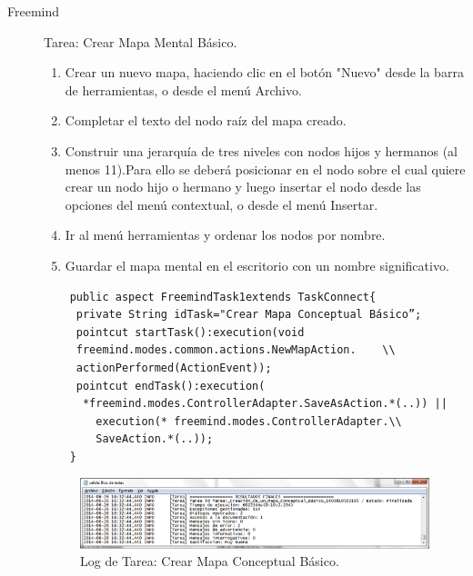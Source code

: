 \begin{description}

\item[Freemind]
Tarea: Crear Mapa Mental Básico.

	\begin{enumerate}
		\item Crear un nuevo mapa, haciendo clic en el botón "Nuevo" desde la barra de herramientas, o desde el menú Archivo. 
		\item Completar el texto del nodo raíz del mapa creado.
		\item Construir una jerarquía de tres niveles con nodos hijos y hermanos (al menos 11).Para ello se deberá posicionar en el nodo sobre el cual quiere crear un nodo hijo o hermano y luego insertar el nodo desde las opciones del menú contextual, o desde el menú Insertar.
		\item Ir al menú herramientas y ordenar los nodos por nombre.
		\item Guardar el mapa mental en el escritorio con un nombre significativo.
	\end{enumerate}
	\begin{verbatim}
	public aspect FreemindTask1extends TaskConnect{
	 private String idTask="Crear Mapa Conceptual Básico”;
	 pointcut startTask():execution(void  
	 freemind.modes.common.actions.NewMapAction.	\\
	 actionPerformed(ActionEvent));
	 pointcut endTask():execution( 	 
	  *freemind.modes.ControllerAdapter.SaveAsAction.*(..)) ||
	    execution(* freemind.modes.ControllerAdapter.\\
	    SaveAction.*(..));
	}
	\end{verbatim}
	\begin{figure}[ht!]
		\centering
		\includegraphics[scale=1]{figs/fig4.png}
		\caption{\label{fig:fig4} Log de Tarea: Crear Mapa Conceptual Básico.}
	\end{figure}


\end{description}
